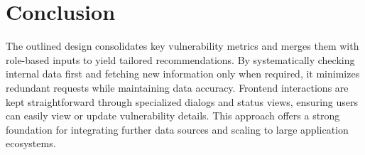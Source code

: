 \section{Conclusion}
\label{sec:design-conclusion}
The outlined design consolidates key vulnerability metrics and merges them with role-based inputs to yield tailored recommendations. By systematically checking internal data first and fetching new information only when required, it minimizes redundant requests while maintaining data accuracy. Frontend interactions are kept straightforward through specialized dialogs and status views, ensuring users can easily view or update vulnerability details. This approach offers a strong foundation for integrating further data sources and scaling to large application ecosystems.